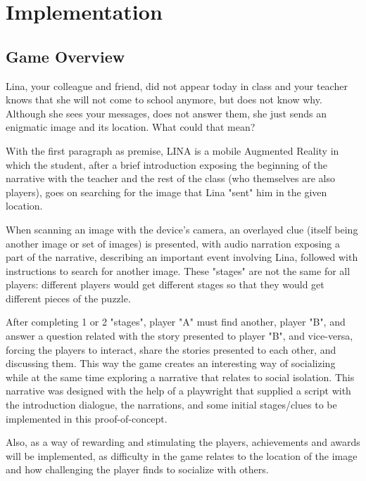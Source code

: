 \documentclass[runningheads]{llncs}
\begin{document}
\newpage
\section{Implementation}

\subsection{Game Overview}
\par Lina, your colleague and friend, did not appear today in class and your teacher knows that she will not come to school anymore, but does not know why. Although she sees your messages, does not answer them, she just sends an enigmatic image and its location. What could that mean?
\par With the first paragraph as premise, LINA is a mobile Augmented Reality in which the student, after a brief introduction exposing the beginning of the narrative with the teacher and the rest of the class (who themselves are also players), goes on searching for the image that Lina "sent" him in the given location. 
\par When scanning an image with the device's camera, an overlayed clue (itself being another image or set of images) is presented, with audio narration exposing a part of the narrative, describing an important event involving Lina, followed with instructions to search for another image. These "stages" are not the same for all players: different players would get different stages so that they would get different pieces of the puzzle. 
\par After completing 1 or 2 "stages", player "A" must find another, player "B", and answer a question related with the story presented to player "B", and vice-versa, forcing the players to interact, share the stories presented to each other, and discussing them. This way the game creates an interesting way of socializing while at the same time exploring a narrative that relates to social isolation. This narrative was designed with the help of a playwright that supplied a script with the introduction dialogue, the narrations, and some initial stages/clues to be implemented in this proof-of-concept. 
\par Also, as a way of rewarding and stimulating the players, achievements and awards will be implemented, as difficulty in the game relates to the location of the image and how challenging the player finds to socialize with others. 
\end{document}
